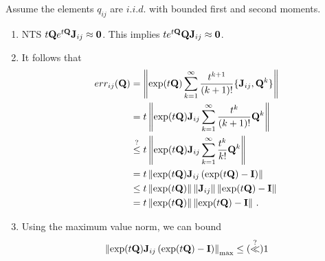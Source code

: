 \documentclass[12pt]{article} %
\begin{document}
Assume the elements $q_{ij}$ are $i.i.d.$ with bounded first and second moments.

\begin{enumerate}
	\item NTS $t\mathbf{Q} e^{t\mathbf{Q}} \mathbf{J}_{ij} \approx \boldsymbol{0}$. This implies $t e^{t\mathbf{Q}}\mathbf{Q} \mathbf{J}_{ij} \approx \boldsymbol{0}$.
	
	\item  It follows that
	\begin{align*}
		err_{ij}(\mathbf{Q}) &=  \left\Vert \exp(t\mathbf{Q})  \sum_{k=1}^\infty \frac{t^{k+1}}{(k+1)!} \{\mathbf{J}_{ij},\mathbf{Q}^k\} \right\Vert \\
		&=t \left\Vert \exp(t\mathbf{Q}) \mathbf{J}_{ij}  \sum_{k=1}^\infty \frac{t^{k}}{(k+1)!} \mathbf{Q}^k \right\Vert \\
		&\stackrel{?}{\leq} t \left\Vert \exp(t\mathbf{Q}) \mathbf{J}_{ij}  \sum_{k=1}^\infty \frac{t^{k}}{k!} \mathbf{Q}^k \right\Vert \\
		&= t \left\Vert \exp(t\mathbf{Q}) \mathbf{J}_{ij}  \left( \exp(t\mathbf{Q})-\mathbf{I} \right) \right\Vert  \\
		&\leq t      \left\Vert\exp(t\mathbf{Q})\right\Vert \left\Vert\mathbf{J}_{ij}\right\Vert \left\Vert\exp(t\mathbf{Q})-\mathbf{I} \right\Vert \\
		&= t      \left\Vert\exp(t\mathbf{Q})\right\Vert \left\Vert\exp(t\mathbf{Q})-\mathbf{I} \right\Vert \, .
	\end{align*}
	\item Using the maximum value norm, we can bound 
	\begin{align*}
\left\Vert \exp(t\mathbf{Q}) \mathbf{J}_{ij}  \left( \exp(t\mathbf{Q})-\mathbf{I} \right) \right\Vert_{\max}  \leq (\stackrel{?}{\ll}) 1
	\end{align*}
\end{enumerate}

%
%
\end{document}
